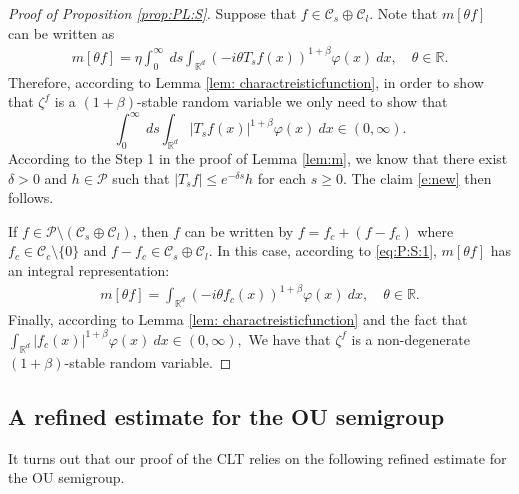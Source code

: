 \documentclass[EJP]{ejpecp} %
\begin{document}
\begin{proof}[Proof of Proposition \ref{prop:PL:S}]
	Suppose that $f\in \mathcal C_s \oplus \mathcal C_l$.
Note that $m[\theta f]$ can be written as
  \begin{align}
    \label{eq:PL:S:1}
    m[\theta f]
    = \eta \int_0^{\infty}~ds\int_{\mathbb R^d} (-i\theta T_s f(x))^{1+\beta} \varphi(x)~dx,
    \quad \theta \in \mathbb R.
  \end{align}
	Therefore, according to Lemma \ref{lem: charactreisticfunction}, in order to show that $\zeta^f$ is a $(1+\beta)$-stable random variable we only need to show that
\begin{equation}\label{e:new}
    \int_0^{\infty}~ds\int_{\mathbb R^d} | T_{s} f(x)|^{1+\beta} \varphi(x)~dx
    \in (0, \infty).
\end{equation}
  According to the Step 1 in the proof of Lemma \ref{lem:m}, we know that there exist $\delta> 0$ and $h \in \mathcal P$ such that $|T_sf| \leq e^{- \delta s} h$ for each $s\geq 0$.
The claim \eqref{e:new} then follows.

  If $f \in \mathcal P \setminus (\mathcal C_s \oplus \mathcal C_l)$, then $f$ can be written by $f = f_c +(f - f_c)$ where $f_c \in \mathcal C_c\setminus\{0\}$ and $f - f_c \in \mathcal C_s \oplus \mathcal C_l$.
  In this case, according to \eqref{eq:P:S:1}, $m[\theta f]$ has an integral representation:
  \begin{align}
    \label{eq:PL:S:2}
    m[\theta f]
    = \int_{\mathbb R^d} (-i\theta f_c(x))^{1+\beta} \varphi(x) ~dx,
    \quad \theta \in \mathbb R.
  \end{align}
  Finally, according to Lemma \ref{lem: charactreisticfunction} and the fact that
 $
    \int_{\mathbb R^d} | f_c(x)|^{1+\beta} \varphi(x)~dx
    \in (0, \infty),
  $
  We have that $\zeta^f$ is a non-degenerate $(1+\beta)$-stable random variable.
\end{proof}

\subsection{A refined estimate for the OU semigroup}\label{sc:refined}
It turns out that our proof of the CLT relies on the following refined estimate for the OU semigroup.
\end{document}

